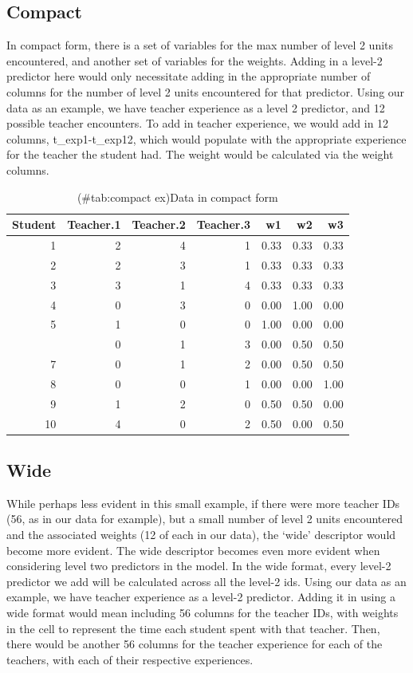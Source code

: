 \documentclass[
]{book}
\begin{document}
\hypertarget{compact-1}{%
\subsection{Compact}\label{compact-1}}

In compact form, there is a set of variables for the max number of level 2 units encountered, and another set of variables for the weights. Adding in a level-2 predictor here would only necessitate adding in the appropriate number of columns for the number of level 2 units encountered for that predictor. Using our data as an example, we have teacher experience as a level 2 predictor, and 12 possible teacher encounters. To add in teacher experience, we would add in 12 columns, t\_exp1-t\_exp12, which would populate with the appropriate experience for the teacher the student had. The weight would be calculated via the weight columns.

\begin{table}

\caption{(\#tab:compact ex)Data in compact form}
\centering
\begin{tabular}[t]{rrrrrrr}
\toprule
Student & Teacher.1 & Teacher.2 & Teacher.3 & w1 & w2 & w3\\
\midrule
1 & 2 & 4 & 1 & 0.33 & 0.33 & 0.33\\
2 & 2 & 3 & 1 & 0.33 & 0.33 & 0.33\\
3 & 3 & 1 & 4 & 0.33 & 0.33 & 0.33\\
4 & 0 & 3 & 0 & 0.00 & 1.00 & 0.00\\
5 & 1 & 0 & 0 & 1.00 & 0.00 & 0.00\\
\addlinespace
6 & 0 & 1 & 3 & 0.00 & 0.50 & 0.50\\
7 & 0 & 1 & 2 & 0.00 & 0.50 & 0.50\\
8 & 0 & 0 & 1 & 0.00 & 0.00 & 1.00\\
9 & 1 & 2 & 0 & 0.50 & 0.50 & 0.00\\
10 & 4 & 0 & 2 & 0.50 & 0.00 & 0.50\\
\bottomrule
\end{tabular}
\end{table}

\hypertarget{wide}{%
\subsection{Wide}\label{wide}}

While perhaps less evident in this small example, if there were more teacher IDs (56, as in our data for example), but a small number of level 2 units encountered and the associated weights (12 of each in our data), the `wide' descriptor would become more evident. The wide descriptor becomes even more evident when considering level two predictors in the model. In the wide format, every level-2 predictor we add will be calculated across all the level-2 ids. Using our data as an example, we have teacher experience as a level-2 predictor. Adding it in using a wide format would mean including 56 columns for the teacher IDs, with weights in the cell to represent the time each student spent with that teacher. Then, there would be another 56 columns for the teacher experience for each of the teachers, with each of their respective experiences.
\end{document}

